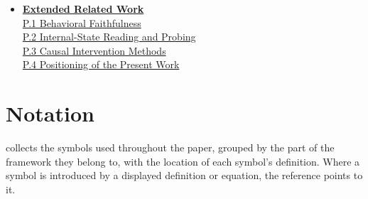 \documentclass[11pt]{article}
\newcommand{\stepk}{k}
\begin{document}
{\begin{itemize}[itemsep=4pt,topsep=2pt,leftmargin=*]
  \hyperref[app:stattests-perm]{O.1 Permutation Tests for $U$}\\
  \hyperref[app:stattests-effect]{O.2 Effect Sizes for $\stepk^{*}$}\\
  \hyperref[app:stattests-summary]{O.3 Summary}
\item[\textbf{P}] \hyperref[app:related]{\textbf{Extended Related Work}}\\[1pt]
  \hyperref[app:related-behavioral]{P.1 Behavioral Faithfulness}\\
  \hyperref[app:related-probing]{P.2 Internal-State Reading and Probing}\\
  \hyperref[app:related-causal]{P.3 Causal Intervention Methods}\\
  \hyperref[app:related-positioning]{P.4 Positioning of the Present Work}
\end{itemize}
}
\vspace{6pt}

\section{Notation}
\label{app:notation}

 collects the symbols used throughout the paper, grouped by
the part of the framework they belong to, with the location of each symbol's
definition. Where a symbol is introduced by a displayed definition or equation,
the reference points to it.
\end{document}
